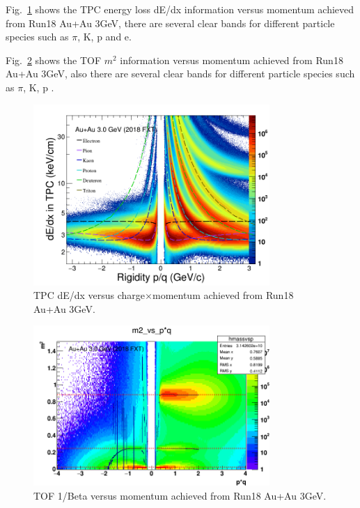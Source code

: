 Fig.~\ref{fig:tpcPID} shows the TPC energy loss dE/dx information versus momentum achieved from Run18 Au+Au 3GeV, there are several clear bands for different particle species such as $\pi$, K, p and e. 

Fig.~\ref{fig:tofPID} shows the TOF $m^2$ information versus momentum achieved from Run18 Au+Au 3GeV, also there are several clear bands for different particle species such as $\pi$, K, p . 

\begin{figure}[htbp]
\centering
\includegraphics[keepaspectratio,width=0.8\textwidth]{chapterY/fig/3gevDedx.png}
\caption{TPC dE/dx versus charge$\times$momentum achieved from Run18 Au+Au 3GeV.}
 \label{fig:tpcPID}
\end{figure}

\begin{figure}[htbp]
\centering
\includegraphics[keepaspectratio,width=0.8\textwidth]{chapterY/fig/3gev_m2_p.png}
\caption{TOF 1/Beta versus momentum achieved from Run18 Au+Au 3GeV.}
 \label{fig:tofPID}
\end{figure}

